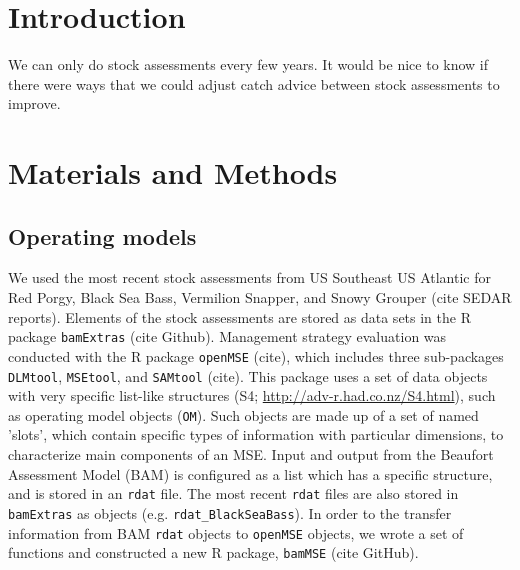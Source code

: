 \documentclass[12pt,english]{article}
\begin{document}
\begin{flushleft}
\begin{spacing}{1.9}
\setlength{\parindent}{1cm} %

\section*{Introduction}
We can only do stock assessments every few years. It would be nice to know if there were ways that we could adjust catch advice between stock assessments to improve.


\section*{Materials and Methods}

\subsection*{Operating models}
We used the most recent stock assessments from US Southeast US Atlantic for Red Porgy, Black Sea Bass, Vermilion Snapper, and Snowy Grouper (cite SEDAR reports). Elements of the stock assessments are stored as data sets in the R package \texttt{bamExtras} (cite Github). Management strategy evaluation was conducted with the R package \texttt{openMSE} (cite), which includes three sub-packages \texttt{DLMtool}, \texttt{MSEtool}, and \texttt{SAMtool} (cite). This package uses a set of data objects with very specific list-like structures (S4; \url{http://adv-r.had.co.nz/S4.html}), such as operating model objects (\texttt{OM}). Such objects are made up of a set of named 'slots', which contain specific types of information with particular dimensions, to characterize main components of an MSE. Input and output from the Beaufort Assessment Model (BAM) is configured as a list which has a specific structure, and is stored in an \texttt{rdat} file. The most recent \texttt{rdat} files are also stored in \texttt{bamExtras} as objects (e.g. \texttt{rdat\_BlackSeaBass}). In order to the transfer information from BAM \texttt{rdat} objects to \texttt{openMSE} objects, we wrote a set of functions and constructed a new R package, \texttt{bamMSE} (cite GitHub).


\end{spacing}
\end{flushleft}
\end{document}
